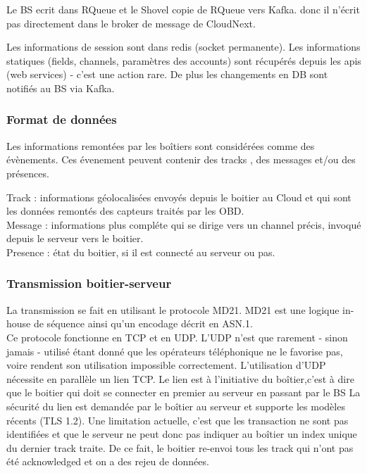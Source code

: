         Le BS ecrit dans RQueue et le Shovel copie de RQueue vers Kafka. donc il n'écrit pas directement dans le broker de message de CloudNext.


        Les informations de session sont dans redis (socket permanente).
        Les informations statiques (fields, channels, paramètres des accounts) sont récupérés depuis les apis (web services) - c’est une action rare.
        De plus les changements en DB sont notifiés au BS via Kafka.

        \subsubsection{Format de données}
        Les informations remontées par les boîtiers sont considérées comme des évènements. Ces évenement peuvent contenir 
        des tracks , des messages et/ou des présences.

        Track : informations géolocalisées envoyés depuis le boitier au Cloud et qui sont les données remontés des capteurs traités par les OBD. \\
        Message : informations plus compléte qui se dirige vers un channel précis, invoqué depuis le serveur vers le boitier.\\
        Presence : état du boitier, si il est connecté au serveur ou pas.\\
        

        \subsubsection{Transmission boitier-serveur }
        La transmission se fait en utilisant le protocole MD21. MD21 est une logique in-house de séquence 
        ainsi qu’un encodage décrit en ASN.1.\\
        Ce protocole fonctionne en TCP et en UDP. L’UDP n’est que rarement - sinon jamais - utilisé étant 
        donné que les opérateurs téléphonique ne le favorise pas, voire rendent son utilisation impossible correctement.
        L’utilisation d’UDP nécessite en parallèle un lien TCP.
        Le lien est à l’initiative du boîtier,c'est à dire que le boitier qui doit se connecter en premier au serveur en passant par le \gls{BS}
        La sécurité du lien est demandée par le boîtier au serveur et supporte les modèles récents (TLS 1.2).
        Une limitation actuelle, c’est que les transaction ne sont pas identifiées et que le serveur ne peut donc pas indiquer 
        au boîtier un index unique du dernier track traite. De ce fait, le boitier re-envoi tous les track qui n’ont pas été 
        acknowledged et on a des rejeu de données.





